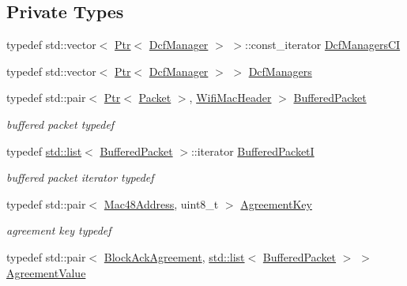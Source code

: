 \subsection*{Private Types}
\begin{DoxyCompactItemize}
\item 
typedef std\+::vector$<$ \hyperlink{classns3_1_1Ptr}{Ptr}$<$ \hyperlink{classns3_1_1DcfManager}{Dcf\+Manager} $>$ $>$\+::const\+\_\+iterator \hyperlink{classns3_1_1MacLow_abf949b68f435e702d6d30c9a1515b35d}{Dcf\+Managers\+CI}
\item 
typedef std\+::vector$<$ \hyperlink{classns3_1_1Ptr}{Ptr}$<$ \hyperlink{classns3_1_1DcfManager}{Dcf\+Manager} $>$ $>$ \hyperlink{classns3_1_1MacLow_a22c50ed96b7e6b6cebe789abf1ce006b}{Dcf\+Managers}
\item 
typedef std\+::pair$<$ \hyperlink{classns3_1_1Ptr}{Ptr}$<$ \hyperlink{classns3_1_1Packet}{Packet} $>$, \hyperlink{classns3_1_1WifiMacHeader}{Wifi\+Mac\+Header} $>$ \hyperlink{classns3_1_1MacLow_ae78fc9611b47a682c09e6ffc9f798be3}{Buffered\+Packet}
\begin{DoxyCompactList}\small\item\em buffered packet typedef \end{DoxyCompactList}\item 
typedef \hyperlink{openflow-interface_8h_afd9bcfa176617760671b67580f536fa7}{std\+::list}$<$ \hyperlink{classns3_1_1MacLow_ae78fc9611b47a682c09e6ffc9f798be3}{Buffered\+Packet} $>$\+::iterator \hyperlink{classns3_1_1MacLow_ac5da0e8293b372fee7df425d9584c0b6}{Buffered\+PacketI}
\begin{DoxyCompactList}\small\item\em buffered packet iterator typedef \end{DoxyCompactList}\item 
typedef std\+::pair$<$ \hyperlink{classns3_1_1Mac48Address}{Mac48\+Address}, uint8\+\_\+t $>$ \hyperlink{classns3_1_1MacLow_a8d666357756bbc5ea2d1b7fac3a5e938}{Agreement\+Key}
\begin{DoxyCompactList}\small\item\em agreement key typedef \end{DoxyCompactList}\item 
typedef std\+::pair$<$ \hyperlink{classns3_1_1BlockAckAgreement}{Block\+Ack\+Agreement}, \hyperlink{openflow-interface_8h_afd9bcfa176617760671b67580f536fa7}{std\+::list}$<$ \hyperlink{classns3_1_1MacLow_ae78fc9611b47a682c09e6ffc9f798be3}{Buffered\+Packet} $>$ $>$ \hyperlink{classns3_1_1MacLow_a68fcd01fab733ead22d9655640258a6a}{Agreement\+Value}

\end{DoxyCompactItemize}
